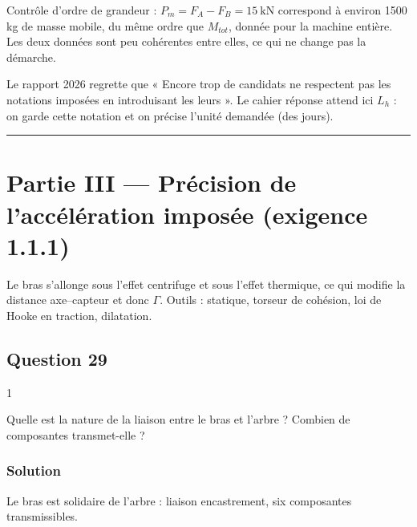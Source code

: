 \documentclass[11pt,a4paper]{article}
\begin{document}
Contrôle d'ordre de grandeur : \(P_m = F_A - F_B = 15\ \text{kN}\) correspond à environ 1500 kg de masse mobile, du même ordre que \(M_{tot}\), donnée pour la machine entière. Les deux données sont peu cohérentes entre elles, ce qui ne change pas la démarche.

\begin{jury}

Le rapport 2026 regrette que « Encore trop de candidats ne respectent pas les notations imposées en introduisant les leurs ». Le cahier réponse attend ici \(L_h\) : on garde cette notation et on précise l'unité demandée (des jours).

\end{jury}

\begin{center}\rule{0.5\linewidth}{0.5pt}\end{center}

\hypertarget{partie-iii-pruxe9cision-de-laccuxe9luxe9ration-imposuxe9e-exigence-1.1.1}{%
\section{Partie III --- Précision de l'accélération imposée (exigence 1.1.1)}\label{partie-iii-pruxe9cision-de-laccuxe9luxe9ration-imposuxe9e-exigence-1.1.1}}

Le bras s'allonge sous l'effet centrifuge et sous l'effet thermique, ce qui modifie la distance axe--capteur et donc \(\Gamma\). Outils : statique, torseur de cohésion, loi de Hooke en traction, dilatation.

\hypertarget{question-29}{%
\subsection{Question 29}\label{question-29}}

\begin{indication}{1}

Quelle est la nature de la liaison entre le bras et l'arbre ? Combien de composantes transmet-elle ?

\end{indication}

\hypertarget{solution-28}{%
\subsubsection{Solution}\label{solution-28}}

Le bras est solidaire de l'arbre : liaison encastrement, six composantes transmissibles.
\end{document}
